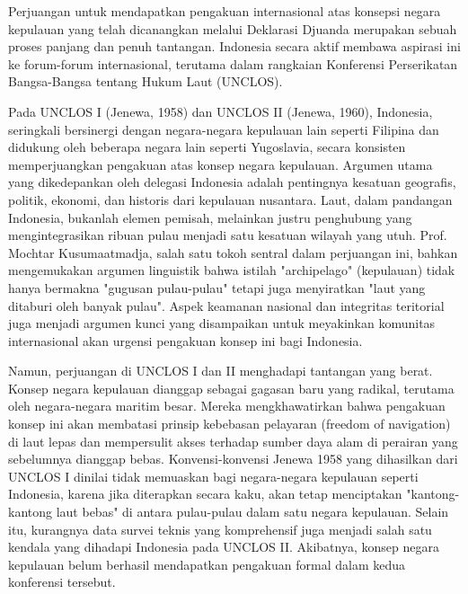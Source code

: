 \documentclass[12pt, a4paper]{article}
\begin{document}
Perjuangan untuk mendapatkan pengakuan internasional atas konsepsi negara kepulauan yang telah dicanangkan melalui Deklarasi Djuanda merupakan sebuah proses panjang dan penuh tantangan. Indonesia secara aktif membawa aspirasi ini ke forum-forum internasional, terutama dalam rangkaian Konferensi Perserikatan Bangsa-Bangsa tentang Hukum Laut (UNCLOS).

Pada UNCLOS I (Jenewa, 1958) dan UNCLOS II (Jenewa, 1960), Indonesia, seringkali bersinergi dengan negara-negara kepulauan lain seperti Filipina dan didukung oleh beberapa negara lain seperti Yugoslavia, secara konsisten memperjuangkan pengakuan atas konsep negara kepulauan. Argumen utama yang dikedepankan oleh delegasi Indonesia adalah pentingnya kesatuan geografis, politik, ekonomi, dan historis dari kepulauan nusantara. Laut, dalam pandangan Indonesia, bukanlah elemen pemisah, melainkan justru penghubung yang mengintegrasikan ribuan pulau menjadi satu kesatuan wilayah yang utuh. Prof. Mochtar Kusumaatmadja, salah satu tokoh sentral dalam perjuangan ini, bahkan mengemukakan argumen linguistik bahwa istilah "archipelago" (kepulauan) tidak hanya bermakna "gugusan pulau-pulau" tetapi juga menyiratkan "laut yang ditaburi oleh banyak pulau". Aspek keamanan nasional dan integritas teritorial juga menjadi argumen kunci yang disampaikan untuk meyakinkan komunitas internasional akan urgensi pengakuan konsep ini bagi Indonesia.  

Namun, perjuangan di UNCLOS I dan II menghadapi tantangan yang berat. Konsep negara kepulauan dianggap sebagai gagasan baru yang radikal, terutama oleh negara-negara maritim besar. Mereka mengkhawatirkan bahwa pengakuan konsep ini akan membatasi prinsip kebebasan pelayaran (freedom of navigation) di laut lepas dan mempersulit akses terhadap sumber daya alam di perairan yang sebelumnya dianggap bebas. Konvensi-konvensi Jenewa 1958 yang dihasilkan dari UNCLOS I dinilai tidak memuaskan bagi negara-negara kepulauan seperti Indonesia, karena jika diterapkan secara kaku, akan tetap menciptakan "kantong-kantong laut bebas" di antara pulau-pulau dalam satu negara kepulauan. Selain itu, kurangnya data survei teknis yang komprehensif juga menjadi salah satu kendala yang dihadapi Indonesia pada UNCLOS II. Akibatnya, konsep negara kepulauan belum berhasil mendapatkan pengakuan formal dalam kedua konferensi tersebut.  
\end{document}

